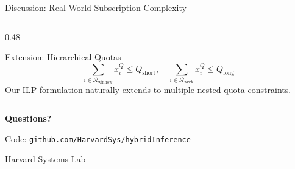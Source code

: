 \documentclass[aspectratio=169,10pt]{beamer}
\begin{document}
\begin{frame}{Discussion: Real-World Subscription Complexity}
\begin{columns}[T]
\begin{column}{0.48\textwidth}
\vspace{0.2cm}
\begin{alertblock}{Extension: Hierarchical Quotas}
\[
\sum_{i \in \mathcal{R}_{\text{window}}} x_i^Q \le Q_{\text{short}}, \quad
\sum_{i \in \mathcal{R}_{\text{week}}} x_i^Q \le Q_{\text{long}}
\]
Our ILP formulation naturally extends to multiple nested quota constraints.
\end{alertblock}
\end{column}
\end{columns}
\end{frame}

\begin{frame}{}
\vspace{1.5cm}
\begin{center}
\textcolor{icmlblue}{\Huge \textbf{Questions?}}

\vspace{1cm}
\large
Code: \texttt{github.com/HarvardSys/hybridInference}

\vspace{0.5cm}
\normalsize
Harvard Systems Lab
\end{center}
\end{frame}

\appendix
\end{document}

